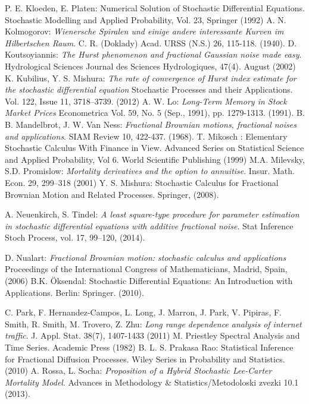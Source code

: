 \documentclass[12pt,reqno]{amsart}
\theoremstyle{definition}
\theoremstyle{remark}
\numberwithin{equation}{section}
\begin{document}
\begin{thebibliography}{99}
 P. E. Kloeden, E. Platen: Numerical Solution of Stochastic Differential Equations. Stochastic
Modelling and Applied Probability, Vol. 23, Springer (1992)
  A. N. Kolmogorov: {\it Wienersche Spiralen und einige andere interessante Kurven  im
 Hilbertschen Raum}. C. R. (Doklady) Acad. URSS (N.S.) 26, 115-118. (1940).
  D. Koutsoyiannis: {\it The Hurst phenomenon and fractional Gaussian noise made easy}.
Hydrological Sciences Journal des Sciences Hydrologiques, 47(4). August (2002)
  K. Kubilius, Y. S. Mishura: {\it The rate of convergence of Hurst index estimate for the stochastic differential equation}
Stochastic Processes and their Applications. Vol. 122, Issue 11,  3718–3739. (2012)
 A. W. Lo: {\it Long-Term Memory in Stock Market Prices}  Econometrica Vol. 59, No. 5 (Sep., 1991), pp. 1279-1313. (1991).
  B. B. Mandelbrot, J. W. Van Ness: {\it Fractional Brownian motions, fractional noises and
applications}. SIAM Review 10, 422-437. (1968).
 T. Mikosch : Elementary Stochastic Calculus With Finance in View. Advanced Series on Statistical Science and Applied
Probability, Vol 6. World Scientific Publishing (1999)
  M.A. Milevsky, S.D. Promislow: {\it Mortality derivatives and the option to annuitise}. Insur. Math.
Econ. 29, 299–318 (2001)
  Y. S. Mishura: Stochastic Calculus for Fractional Brownian Motion and Related Processes.
Springer, (2008).

 A. Neuenkirch, S. Tindel: {\it A least square-type procedure for parameter estimation in stochastic differential
equations with additive fractional noise}. Stat Inference Stoch Process, vol. 17, 99–120, (2014).


 D. Nualart: {\it Fractional Brownian motion: stochastic calculus and applications }
Proceedings of the International Congress of Mathematicians, Madrid, Spain, (2006)
 B.K. \"Oksendal: Stochastic Differential Equations: An Introduction with Applications. Berlin: Springer.  (2010).

 C. Park, F. Hernandez-Campos, L. Long, J. Marron, J. Park, V. Pipiras, F. Smith, R. Smith, M. Trovero, Z. Zhu:
{\it Long range dependence analysis of internet traffic}. J. Appl. Stat. 38(7), 1407-1433 (2011)
 M. Priestley Spectral Analysis and Time Series. Academic Press (1982)
 B. L. S. Prakasa Rao: Statistical Inference for Fractional Diffusion Processes. Wiley Series in Probability and Statistics.
(2010)
 A. Rossa, L. Socha: {\it Proposition of a Hybrid Stochastic Lee-Carter Mortality Model}. Advances in Methodology \&
Statistics/Metodoloski zvezki 10.1 (2013).



\end{thebibliography}
\end{document}
